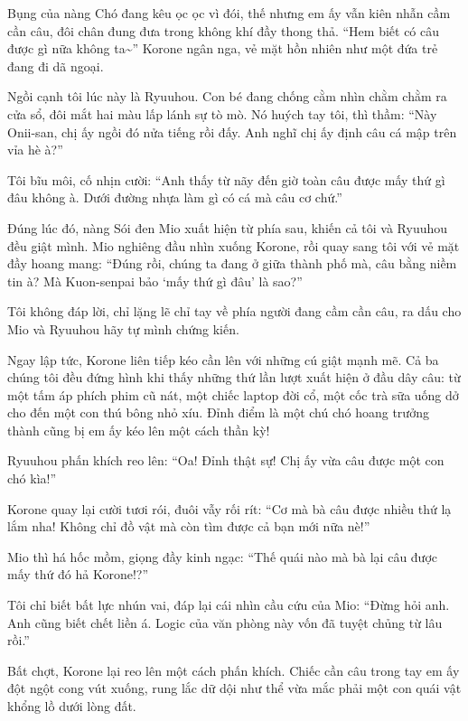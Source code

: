 \documentclass[../main.tex]{subfiles}
\begin{document}
\chrint


Bụng của nàng Chó đang kêu ọc ọc vì đói, thế nhưng em ấy vẫn kiên nhẫn cầm cần câu, đôi chân đung đưa trong không khí đầy thong thả. ``Hem biết có câu được gì nữa không ta\~{}'' Korone ngân nga, vẻ mặt hồn nhiên như một đứa trẻ đang đi dã ngoại.

Ngồi cạnh tôi lúc này là Ryuuhou. Con bé đang chống cằm nhìn chằm chằm ra cửa sổ, đôi mắt hai màu lấp lánh sự tò mò. Nó huých tay tôi, thì thầm: ``Này Onii-san, chị ấy ngồi đó nửa tiếng rồi đấy. Anh nghĩ chị ấy định câu cá mập trên vỉa hè à?''

Tôi bĩu môi, cố nhịn cười: ``Anh thấy từ nãy đến giờ toàn câu được mấy thứ gì đâu không à. Dưới đường nhựa làm gì có cá mà câu cơ chứ.''

Đúng lúc đó, nàng Sói đen Mio xuất hiện từ phía sau, khiến cả tôi và Ryuuhou đều giật mình. Mio nghiêng đầu nhìn xuống Korone, rồi quay sang tôi với vẻ mặt đầy hoang mang: ``Đúng rồi, chúng ta đang ở giữa thành phố mà, câu bằng niềm tin à? Mà Kuon-senpai bảo `mấy thứ gì đâu' là sao?''

Tôi không đáp lời, chỉ lặng lẽ chỉ tay về phía người đang cầm cần câu, ra dấu cho Mio và Ryuuhou hãy tự mình chứng kiến.

Ngay lập tức, Korone liên tiếp kéo cần lên với những cú giật mạnh mẽ. Cả ba chúng tôi đều đứng hình khi thấy những thứ lần lượt xuất hiện ở đầu dây câu: từ một tấm áp phích phim cũ nát, một chiếc laptop đời cổ, một cốc trà sữa uống dở cho đến một con thú bông nhỏ xíu. Đỉnh điểm là một chú chó hoang trưởng thành cũng bị em ấy kéo lên một cách thần kỳ!


Ryuuhou phấn khích reo lên: ``Oa! Đỉnh thật sự! Chị ấy vừa câu được một con chó kìa!''

Korone quay lại cười tươi rói, đuôi vẫy rối rít: ``Cơ mà bà câu được nhiều thứ lạ lắm nha! Không chỉ đồ vật mà còn tìm được cả bạn mới nữa nè!''

Mio thì há hốc mồm, giọng đầy kinh ngạc: ``Thế quái nào mà bà lại câu được mấy thứ đó hả Korone!?''

Tôi chỉ biết bất lực nhún vai, đáp lại cái nhìn cầu cứu của Mio: ``Đừng hỏi anh. Anh cũng biết chết liền á. Logic của văn phòng này vốn đã tuyệt chủng từ lâu rồi.''

Bất chợt, Korone lại reo lên một cách phấn khích. Chiếc cần câu trong tay em ấy đột ngột cong vút xuống, rung lắc dữ dội như thể vừa mắc phải một con quái vật khổng lồ dưới lòng đất.
\end{document}
